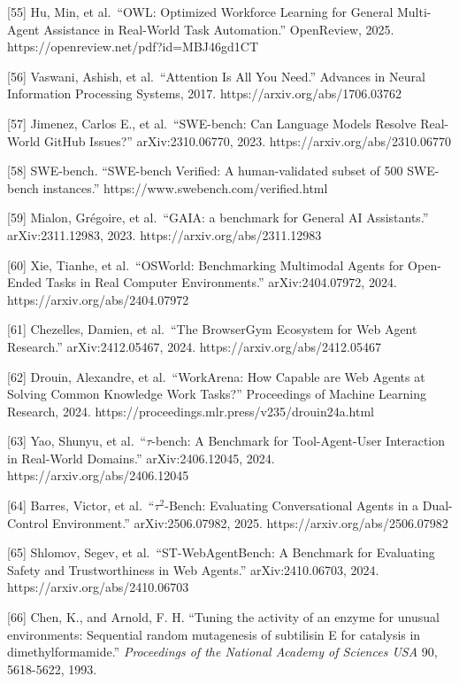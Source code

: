 \documentclass[11pt]{article}
\begin{document}
{[}55{]} Hu, Min, et al.~``OWL: Optimized Workforce Learning for General Multi-Agent Assistance in Real-World Task Automation.'' OpenReview, 2025. https://openreview.net/pdf?id=MBJ46gd1CT

{[}56{]} Vaswani, Ashish, et al.~``Attention Is All You Need.'' Advances in Neural Information Processing Systems, 2017. https://arxiv.org/abs/1706.03762

{[}57{]} Jimenez, Carlos E., et al.~``SWE-bench: Can Language Models Resolve Real-World GitHub Issues?'' arXiv:2310.06770, 2023. https://arxiv.org/abs/2310.06770

{[}58{]} SWE-bench. ``SWE-bench Verified: A human-validated subset of 500 SWE-bench instances.'' https://www.swebench.com/verified.html

{[}59{]} Mialon, Grégoire, et al.~``GAIA: a benchmark for General AI Assistants.'' arXiv:2311.12983, 2023. https://arxiv.org/abs/2311.12983

{[}60{]} Xie, Tianhe, et al.~``OSWorld: Benchmarking Multimodal Agents for Open-Ended Tasks in Real Computer Environments.'' arXiv:2404.07972, 2024. https://arxiv.org/abs/2404.07972

{[}61{]} Chezelles, Damien, et al.~``The BrowserGym Ecosystem for Web Agent Research.'' arXiv:2412.05467, 2024. https://arxiv.org/abs/2412.05467

{[}62{]} Drouin, Alexandre, et al.~``WorkArena: How Capable are Web Agents at Solving Common Knowledge Work Tasks?'' Proceedings of Machine Learning Research, 2024. https://proceedings.mlr.press/v235/drouin24a.html

{[}63{]} Yao, Shunyu, et al.~``\(\tau\)-bench: A Benchmark for Tool-Agent-User Interaction in Real-World Domains.'' arXiv:2406.12045, 2024. https://arxiv.org/abs/2406.12045

{[}64{]} Barres, Victor, et al.~``\(\tau^2\)-Bench: Evaluating Conversational Agents in a Dual-Control Environment.'' arXiv:2506.07982, 2025. https://arxiv.org/abs/2506.07982

{[}65{]} Shlomov, Segev, et al.~``ST-WebAgentBench: A Benchmark for Evaluating Safety and Trustworthiness in Web Agents.'' arXiv:2410.06703, 2024. https://arxiv.org/abs/2410.06703

{[}66{]} Chen, K., and Arnold, F. H. ``Tuning the activity of an enzyme for unusual environments: Sequential random mutagenesis of subtilisin E for catalysis in dimethylformamide.'' \emph{Proceedings of the National Academy of Sciences USA} 90, 5618-5622, 1993.
\end{document}
